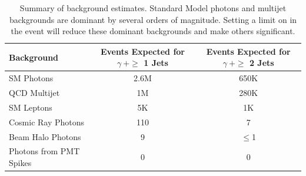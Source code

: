 \documentclass[slac_one]{revtex4}
\begin{document}


\begin{table}[ht]
\begin{center}
\caption{Summary of background estimates. Standard Model photons and multijet backgrounds are dominant by several orders
of magnitude. Setting a limit on \met in the event will reduce these dominant backgrounds and make others significant.}
\begin{tabular}{|l|c|c|}
\hline \textbf{Background} & \textbf{Events Expected for $\gamma~+ \geq$ 1 Jets} & \textbf{Events Expected for $\gamma~+ \geq$ 2 Jets} \\
\hline SM Photons & 2.6M & 650K \\
\hline QCD Multijet	 & 1M & 280K \\
\hline SM Leptons & 5K & 1K \\
\hline Cosmic Ray Photons & 110 & 7 \\
\hline Beam Halo Photons	 & 9 & $\le$1\\
\hline Photons from PMT Spikes & 0 & 0 \\
\hline
\end{tabular}
\label{tab-bg-estimates}
\end{center}
\end{table}
\end{document}
